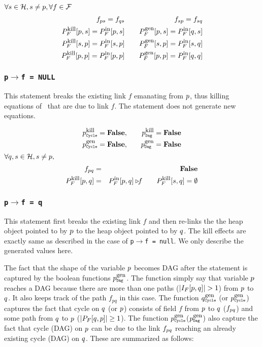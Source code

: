 $\forall s \in \mathcal{H}, s \not= p, \forall f \in \mathcal{F}$
\begin{eqnarray*}
  f_{\p\s} = f_{\q\s}  &\quad&  f_{\s\p} = f_{\s\q} \\
  P_F^{\dkill}[\p,\s]  =  P_F^{\din}[\p,\s] &\quad&
  P_F^{\dgen}[\p,\s]    =  P_F^{\din}[\q,\s]   \\ 
  P_F^{\dkill}[\s,\p]  =  P_F^{\din}[\s,\p] &\quad&
  P_F^{\dgen}[\s,\p]    =  P_F^{\din}[\s,\q]   \\
  P_F^{\dkill}[\p,\p]  =  P_F^{\din}[\p,\p] &\quad&
  P_F^{\dgen}[\p,\p]    =  P_F^{\din}[\q,\q]  \rule{0mm}{0pt}\\
\end{eqnarray*}


\subsubsection {\tt p$\rightarrow$f = NULL} 
This statement  breaks the  existing link $f$  emanating from
$p$,  thus killing  equations of  \p\ that  are due  to link
$f$. The statement does not generate new equations.

\begin{eqnarray*}
  \KillC{p}  = \false, &\quad& \KillD{p} = \false \\
  \GenC{p} = \false, &\quad& \GenD{p} = \false  \\
\end{eqnarray*}
$\forall q,s \in \mathcal{H}, s \not= p,$
\begin{eqnarray*}
  f_{pq} &=& \textbf{False} \\
  P_F^{\mbox{\footnotesize kill}}[p,q] &=& P_F^{\mbox{\footnotesize in}}[p,q]\triangleright\!\!f
  \qquad
  P_F^{\mbox{\footnotesize kill}}[s,q]  = \emptyset
\end{eqnarray*}
\subsubsection {\tt p$\rightarrow$f = q} 
This statement  first breaks the  existing link $f$  and then
re-links the the  heap object pointed to by  $p$ to the heap
object pointed to by $q$.  The kill effects are exactly same
as described in the case  of {\tt p$\rightarrow$f = null}. We
only describe the generated values here.
  
The  fact that  the shape  of the  variable $p$  becomes DAG
after  the statement  is  captured by  the boolean  functions
$\GenD{p}$.   The  function  simply  say that  variable  $p$
reaches  a  DAG  because   there  are  more  than  one  paths
($|I_F[p,q]| > 1$) from $p$ to $q$. It also keeps track
of the  path $f_{pq}$ in this case.   The function $\GenC{q}$
(or  $\GenC{p}$) captures  the fact  that cycle  on  $q$ (or
$p$) consists  of field $f$  from $p$ to  $q$ ($f_{pq}$)
and some path from  $q$ to $p$ ($|P_F[q,p]| \geq 1$).
The  function $\GenC{p}$($\GenD{p}$)  also  capture the  fact
that cycle  (DAG) on $p$ can  be due to  the link $f_{pq}$
reaching an already existing  cycle (DAG) on $q$.  These are
summarized as follows:


